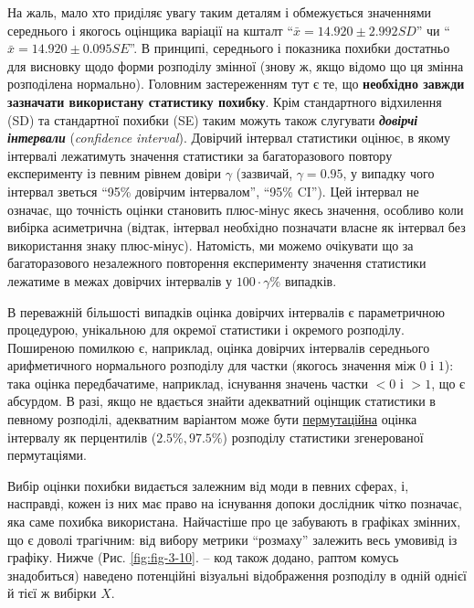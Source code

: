 \documentclass[
  11pt,
]{book}
\begin{document}
На жаль, мало хто приділяє увагу таким деталям і обмежується значеннями середнього і якогось оцінщика варіації на кшталт ``\(\bar{x} = 14.920 \pm 2.992 SD\)'' чи ``\(\bar{x} = 14.920 \pm 0.095 SE\)''. В принципі, середнього і показника похибки достатньо для висновку щодо форми розподілу змінної (знову ж, якщо відомо що ця змінна розподілена нормально). Головним застереженням тут є те, що \textbf{необхідно завжди зазначати використану статистику похибку}. Крім стандартного відхилення (SD) та стандартної похибки (SE) таким можуть також слугувати \textbf{\emph{довірчі інтервали}} (\emph{confidence interval}). Довірчий інтервал статистики оцінює, в якому інтервалі лежатимуть значення статистики за багаторазового повтору експерименту із певним рівнем довіри \(\gamma\) (зазвичай, \(\gamma = 0.95\), у випадку чого інтервал зветься ``95\% довірчим інтервалом'', ``95\% CI''). Цей інтервал не означає, що точність оцінки становить плюс-мінус якесь значення, особливо коли вибірка асиметрична (відтак, інтервал необхідно позначати власне як інтервал без використання знаку плюс-мінус). Натомість, ми можемо очікувати що за багаторазового незалежного повторення експерименту значення статистики лежатиме в межах довірчих інтервалів у \(100 \cdot \gamma \%\) випадків.

В переважній більшості випадків оцінка довірчих інтервалів є параметричною процедурою, унікальною для окремої статистики і окремого розподілу. Поширеною помилкою є, наприклад, оцінка довірчих інтервалів середнього арифметичного нормального розподілу для частки (якогось значення між \(0\) і \(1\)): така оцінка передбачатиме, наприклад, існування значень частки \(<0\) і \(>1\), що є абсурдом. В разі, якщо не вдається знайти адекватний оцінщик статистики в певному розподілі, адекватним варіантом може бути \hyperref[paradigms]{пермутаційна} оцінка інтервалу як перцентилів (\(2.5\%, 97.5\%\)) розподілу статистики згенерованої пермутаціями.

Вибір оцінки похибки видається залежним від моди в певних сферах, і, насправді, кожен із них має право на існування допоки дослідник чітко позначає, яка саме похибка використана. Найчастіше про це забувають в графіках змінних, що є доволі трагічним: від вибору метрики ``розмаху'' залежить весь умовивід із графіку. Нижче (Рис. \ref{fig:fig-3-10}. -- код також додано, раптом комусь знадобиться) наведено потенційні візуальні відображення розподілу в одній однієї й тієї ж вибірки \(X\).
\end{document}
